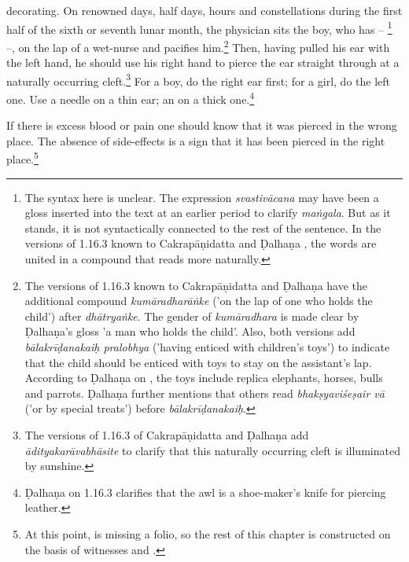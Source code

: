 \begin{translation}
    decorating. On renowned days, half days, hours and constellations during the first half of the sixth or seventh lunar month, the physician sits the boy, who has  -- \footnote{The syntax here is unclear. The expression \emph{svastivācana} may have been a gloss inserted into the text at an earlier period to clarify \emph{maṅgala}.  But as it stands, it is not syntactically connected to the rest of the sentence. In the versions of 1.16.3 known to Cakrapāṇidatta \citep[126]{acar-1939} and Ḍalhaṇa \citep[76]{vulgate}, the words are united in a compound that reads more naturally.} --, on the lap of a wet-nurse and pacifies him.\footnote{The versions of 1.16.3 known to Cakrapāṇidatta \citep[126]{acar-1939} and Ḍalhaṇa \citep[76]{vulgate} have the additional compound \emph{kumāradharāṅke} ('on the lap of one who holds the child') after \emph{dhātryaṅke}. The gender of \emph{kumāradhara} is made clear by  Ḍalhaṇa's gloss 'a man who holds the child'. Also, both versions add \emph{bālakrīḍanakaiḥ pralobhya} ('having enticed with children's toys') to indicate that the child should be enticed with toys to stay on the assistant's lap. According to Ḍalhaṇa on , the toys include replica elephants, horses, bulls and parrots. Ḍalhaṇa further mentions that others read \emph{bhakṣyaviśeṣair vā} ('or by special treats') before \emph{bālakrīḍanakaiḥ}.} Then, having pulled his ear with the left hand, he should use his right hand to pierce the ear straight through at a naturally occurring cleft.\footnote{The versions of 1.16.3 of Cakrapāṇidatta \citep[126]{acar-1939} and Ḍalhaṇa \citep[76]{vulgate} add \emph{ādityakarāvabhāsite} to clarify that this naturally occurring cleft is illuminated by sunshine.} For a boy, do
    the right ear first; for a girl, do the left one. Use a needle on a
    thin ear; an  on a thick one.\footnote{Ḍalhaṇa on 1.16.3 \citep[76]{vulgate} clarifies that the awl is a shoe-maker's knife for piercing leather.}
    
    \item [3]  If there is excess blood or pain one should know that it was pierced
    in the wrong place. The absence of side-effects is a sign that it has been pierced 
    in the right place.\footnote{At this point,  is missing a folio, so the rest of this chapter
    is constructed on the basis of witnesses  and 
    .}
    

\end{translation}

